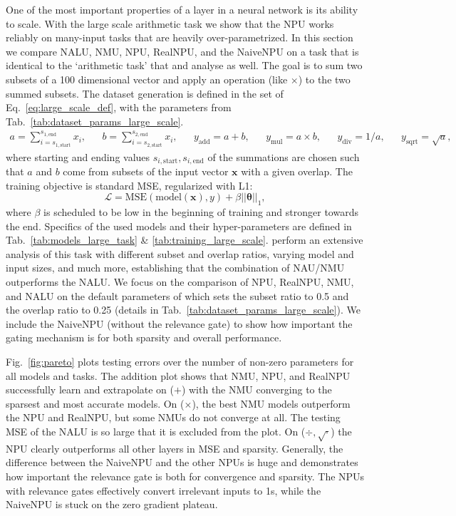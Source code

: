 \documentclass[9pt]{article}
\begin{document}
One of the most important properties of a layer in a neural network is its
ability to scale. With the large scale arithmetic task we show that the NPU
works reliably on many-input tasks that are heavily over-parametrized.  In this
section we compare NALU, NMU, NPU, RealNPU, and the NaiveNPU on a task that is identical
to the `arithmetic task' that \cite{madsen_neural_2020} and
\cite{trask_neural_2018} analyse as well.
The goal is to sum two subsets of a 100 dimensional vector and
apply an operation (like $\times$) to the two summed subsets.  The dataset
generation is defined in the set of Eq.~\ref{eq:large_scale_def}, with the
parameters from Tab.~\ref{tab:dataset_params_large_scale}.
\begin{align}
  \label{eq:large_scale_def}
  a = \sum_{i=s_{1,\text{start}}}^{s_{1,\text{end}}} x_i, &&
  b = \sum_{i=s_{2,\text{start}}}^{s_{2,\text{end}}} x_i, &&
  y_{\text{add}} = a + b, && y_{\text{mul}} = a \times b, &&
  y_{\text{div}} = 1 / a, && y_{\text{sqrt}} = \sqrt{a},
\end{align}
where starting and ending values $s_{i,\text{start}},s_{i,\text{end}}$ of the
summations are chosen such that $a$ and $b$ come from subsets of the input
vector $\bm x$ with a given overlap.  The training objective is standard MSE,
regularized with L1:
\begin{equation}
  \mathcal{L} = \text{MSE}(\text{model}(\bm x), y) + \beta||\bm\theta||_1,
\end{equation}
where $\beta$ is scheduled to be low in the beginning of training and stronger
towards the end.  Specifics of the used models and their hyper-parameters are defined in
Tab.~\ref{tab:models_large_task} \& \ref{tab:training_large_scale}.  \cite{madsen_neural_2020} perform an
extensive analysis of this task with different subset and overlap ratios,
varying model and input sizes, and much more, establishing that the combination
of NAU/NMU outperforms the NALU. We focus on the
comparison of NPU, RealNPU, NMU, and NALU on the default parameters of
\cite{madsen_neural_2020} which sets the subset ratio to 0.5 and the overlap
ratio to 0.25 (details in Tab.~\ref{tab:dataset_params_large_scale}).
We include the NaiveNPU (without the relevance gate) to show
how important the gating mechanism is for both sparsity and overall
performance.

Fig.~\ref{fig:pareto} plots testing errors over the number of non-zero
parameters for all models and tasks.  The addition plot shows that NMU, NPU,
and RealNPU successfully learn and extrapolate on ($+$) with the NMU converging
to the sparsest and most accurate models.
On ($\times$), the best NMU models outperform the NPU and RealNPU, but some
NMUs do not converge at all. The testing MSE of the NALU is so large that it is
excluded from the plot.
On ($\div,\sqrt{\cdot}$) the NPU clearly outperforms all other layers
in MSE and sparsity. Generally, the difference between the NaiveNPU and the other NPUs
is huge and demonstrates how important the relevance gate is both
for convergence and sparsity. The NPUs with relevance gates effectively convert
irrelevant inputs to 1s, while the NaiveNPU is stuck on the zero gradient
plateau.
\end{document}
